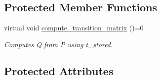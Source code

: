 \subsection*{Protected Member Functions}
\begin{DoxyCompactItemize}
\item 
virtual void \hyperlink{classretrocombinator_1_1PointMutationModel_a29357db0a7cfb35ab1540840aa4cfda1}{compute\+\_\+transition\+\_\+matrix} ()=0
\begin{DoxyCompactList}\small\item\em Computes Q from P using t\+\_\+stored. \end{DoxyCompactList}\end{DoxyCompactItemize}
\subsection*{Protected Attributes}
